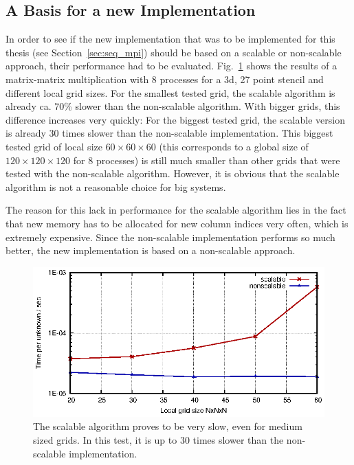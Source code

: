 \subsection{A Basis for a new Implementation}
In order to see if the new implementation that was to be implemented for this thesis (see Section~\ref{sec:seq_mpi}) should be based on a scalable or non-scalable approach, their performance had to be evaluated. Fig.~\ref{fig:scalable} shows the results of a matrix-matrix multiplication with 8 processes for a 3d, 27 point stencil and different local grid sizes. For the smallest tested grid, the scalable algorithm is already ca. 70\% slower than the non-scalable algorithm. With bigger grids, this difference increases very quickly: For the biggest tested grid, the scalable version is already 30 times slower than the non-scalable implementation. This biggest tested grid of local size $60 \times 60 \times 60$ (this corresponds to a global size of $120\times 120 \times 120$ for 8 processes) is still much smaller than other grids that were tested with the non-scalable algorithm. However, it is obvious that the scalable algorithm is not a reasonable choice for big systems. 

The reason for this lack in performance for the scalable algorithm lies in the fact that new memory has to be allocated for new column indices very often, which is extremely expensive. Since the non-scalable implementation performs so much better, the new implementation is based on a non-scalable approach. 

\begin{figure}[tbp]
	\centering
	\includegraphics[width=1\textwidth]{scalable}
	\caption{The scalable algorithm proves to be very slow, even for medium sized grids. In this test, it is up to 30 times slower than the non-scalable implementation.} 
	\label{fig:scalable}
\end{figure}

